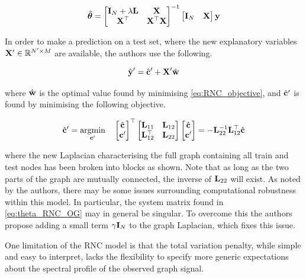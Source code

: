 \begin{equation}
    \label{eq:theta_RNC_OG}
    \hat{\boldsymbol{\theta}} = \begin{bmatrix}
        \mathbf{I}_N + \lambda \mathbf{L} & \mathbf{X} \\ \mathbf{X}^\top & \mathbf{X}^\top \mathbf{X}
    \end{bmatrix}^{-1} \begin{bmatrix}
        \mathbf{I}_N & \mathbf{X}
    \end{bmatrix} \mathbf{y}
\end{equation}

In order to make a prediction on a test set, where the new explanatory variables $\mathbf{X}' \in \mathbb{R}^{N' \times M}$ are available, the authors use the following. 

\begin{equation}
    \hat{\mathbf{y}}' = \hat{\mathbf{c}}' + \mathbf{X}' \hat{\mathbf{w}}
\end{equation}

where $\hat{\mathbf{w}}$ is the optimal value found by minimising \cref{eq:RNC_objective}, and $\hat{\mathbf{c}}'$ is found by minimising the following objective. 

\begin{equation}
    \hat{\mathbf{c}}' = \underset{\mathbf{c}'}{\text{argmin}} \quad \begin{bmatrix}
        \hat{\mathbf{c}} \\ \mathbf{c}' 
    \end{bmatrix}^\top \begin{bmatrix}
        \mathbf{L}_{11} & \mathbf{L}_{12} \\ \mathbf{L}_{12}^\top & \mathbf{L}_{22}
    \end{bmatrix} \begin{bmatrix}
        \hat{\mathbf{c}} \\ \mathbf{c}' 
    \end{bmatrix} = - \mathbf{L}_{22}^{-1} \mathbf{L}_{12}^\top \hat{\mathbf{c}}
\end{equation}

where the new Laplacian characterising the full graph containing all train and test nodes has been broken into blocks as shown. Note that as long as the two parts of the graph are mutually connected, the inverse of $\mathbf{L}_{22}$ will exist. As noted by the authors, there may be some issues surrounding computational robustness within this model. In particular, the system matrix found in \cref{eq:theta_RNC_OG} may in general be singular. To overcome this the authors propose adding a small term $\gamma \mathbf{I}_N$ to the graph Laplacian, which fixes this issue. 

One limitation of the RNC model is that the total variation penalty, while simple and easy to interpret, lacks the flexibility to specify more generic expectations about the spectral profile of the observed graph signal. 

